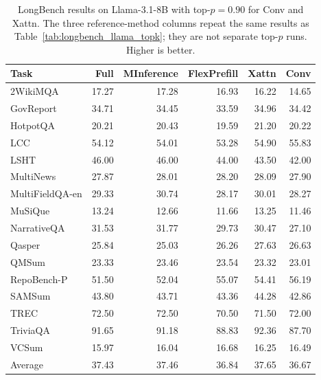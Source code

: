 \begin{table}[t]
    \centering
    \caption{LongBench results on Llama-3.1-8B with top-$p=0.90$ for Conv and Xattn. The three reference-method columns repeat the same results as Table~\ref{tab:longbench_llama_topk}; they are not separate top-$p$ runs. Higher is better.}
    \label{tab:longbench_llama_topp}
    \small
    \setlength{\tabcolsep}{5pt}
    \begin{tabular}{lrrrrr}
        \toprule
        Task & Full & MInference & FlexPrefill & Xattn & Conv \\
        \midrule
        2WikiMQA & 17.27 & 17.28 & 16.93 & 16.22 & 14.65 \\
        GovReport & 34.71 & 34.45 & 33.59 & 34.96 & 34.42 \\
        HotpotQA & 20.21 & 20.43 & 19.59 & 21.20 & 20.22 \\
        LCC & 54.12 & 54.01 & 53.28 & 54.90 & 55.83 \\
        LSHT & 46.00 & 46.00 & 44.00 & 43.50 & 42.00 \\
        MultiNews & 27.87 & 28.01 & 28.20 & 28.09 & 27.90 \\
        MultiFieldQA-en & 29.33 & 30.74 & 28.17 & 30.01 & 28.27 \\
        MuSiQue & 13.24 & 12.66 & 11.66 & 13.25 & 11.46 \\
        NarrativeQA & 31.53 & 31.77 & 29.73 & 30.47 & 27.10 \\
        Qasper & 25.84 & 25.03 & 26.26 & 27.63 & 26.63 \\
        QMSum & 23.33 & 23.46 & 23.54 & 23.32 & 23.01 \\
        RepoBench-P & 51.50 & 52.04 & 55.07 & 54.41 & 56.19 \\
        SAMSum & 43.80 & 43.71 & 43.36 & 44.28 & 42.86 \\
        TREC & 72.50 & 72.50 & 70.50 & 71.50 & 72.00 \\
        TriviaQA & 91.65 & 91.18 & 88.83 & 92.36 & 87.70 \\
        VCSum & 15.97 & 16.04 & 16.68 & 16.25 & 16.49 \\
        \midrule
        Average & 37.43 & 37.46 & 36.84 & 37.65 & 36.67 \\
        \bottomrule
    \end{tabular}
\end{table}

